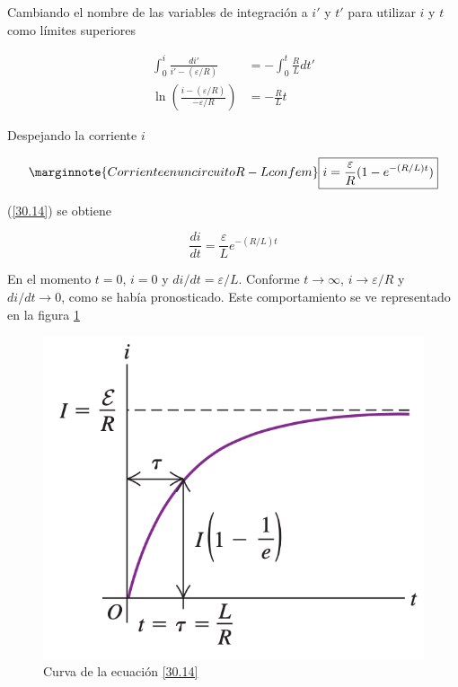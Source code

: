 Cambiando el nombre de las variables de integración a $i'$ y $t'$ para utilizar $i$ y $t$ como límites superiores

\begin{align*}
\int_0^{i}\frac{di'}{i'-(\varepsilon /R)}&=-\int_0^{t}\frac{R}{L}dt' \\
\ln\left(\frac{i-(\varepsilon /R)}{-\varepsilon /R}\right)&=-\frac{R}{L}t
\end{align*}

Despejando la corriente $i$

\begin{equation}\label{30.14}\marginnote{Corriente en un circuito R-L con fem}
\boxed{i=\frac{\varepsilon}{R}(1-e^{-(R/L)t})}
\end{equation}

(\ref{30.14}) se obtiene

\begin{equation}\label{30.15}
\frac{di}{dt}=\frac{\varepsilon}{L}e^{-(R/L)t}
\end{equation}

En el momento $t=0$, $i=0$ y $di/dt=\varepsilon /L$. Conforme $t\to\infty$, $i\to \varepsilon /R$ y $di/dt\to 0$, como se había pronosticado. Este comportamiento se ve representado en la figura \ref{fig:rl-grafico}

\begin{figure}[h]
\centering
\includegraphics[scale=0.5]{fig/rl-grafico}
\caption{Curva de la ecuación \ref{30.14}}
\label{fig:rl-grafico}
\end{figure}

